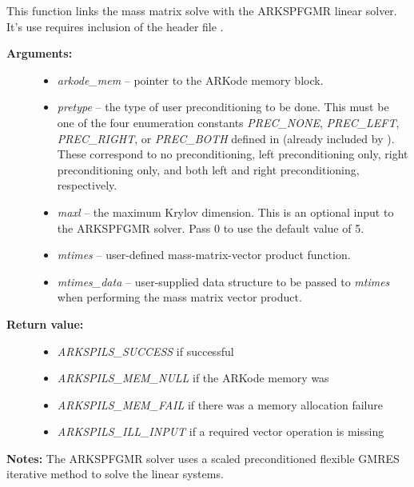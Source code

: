 \documentclass[letterpaper,10pt,english]{sphinxmanual}
\begin{document}

\begin{fulllineitems}
\label{c_interface/User_callable:c.ARKMassSpfgmr}
This function links the mass matrix solve with the ARKSPFGMR linear
solver.  It's use requires inclusion of the header file
.
\begin{description}
\item[{\textbf{Arguments:}}] \leavevmode\begin{itemize}
\item {} 
\emph{arkode\_mem} -- pointer to the ARKode memory block.

\item {} 
\emph{pretype} -- the type of user preconditioning to be done.  This
must be one of the four enumeration constants \emph{PREC\_NONE},
\emph{PREC\_LEFT}, \emph{PREC\_RIGHT}, or \emph{PREC\_BOTH} defined in
 (already included by
). These correspond to no preconditioning,
left preconditioning only, right preconditioning only, and
both left and right preconditioning, respectively.

\item {} 
\emph{maxl} -- the maximum Krylov dimension. This is an optional input
to the ARKSPFGMR solver. Pass 0 to use the default value of 5.

\item {} 
\emph{mtimes} -- user-defined mass-matrix-vector product function.

\item {} 
\emph{mtimes\_data} -- user-supplied data structure to be passed
to \emph{mtimes} when performing the mass matrix vector product.

\end{itemize}

\item[{\textbf{Return value:}}] \leavevmode\begin{itemize}
\item {} 
\emph{ARKSPILS\_SUCCESS} if successful

\item {} 
\emph{ARKSPILS\_MEM\_NULL}  if the ARKode memory was 

\item {} 
\emph{ARKSPILS\_MEM\_FAIL}  if there was a memory allocation failure

\item {} 
\emph{ARKSPILS\_ILL\_INPUT} if a required vector operation is missing

\end{itemize}

\end{description}

\textbf{Notes:} The ARKSPFGMR solver uses a scaled preconditioned
flexible GMRES iterative method to solve the linear systems.

\end{fulllineitems}
\end{document}

